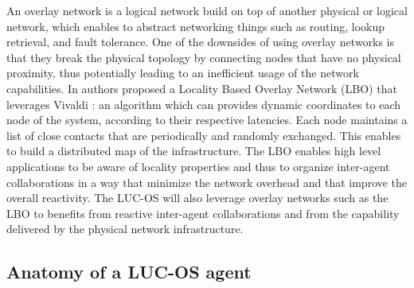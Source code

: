 An overlay network is a logical network build on top of another physical or 
logical network, which enables to abstract networking things such as routing, 
lookup retrieval, and fault tolerance. One of the downsides of using overlay 
networks is that they break the physical topology by connecting nodes that have 
no physical proximity, thus potentially leading to an inefficient usage of the
network capabilities. In \cite{pastor:hal-00991530} authors proposed a Locality 
Based Overlay Network (LBO) that leverages Vivaldi \cite{dabek:2004:vivaldi}: an
algorithm which can provides dynamic coordinates to each node of the system, 
according to their respective latencies. Each node 
maintains a list of close contacts that are periodically and randomly exchanged.
This enables to build a distributed map of the infrastructure. The LBO enables 
high level applications to be aware of locality properties and thus to organize 
inter-agent collaborations in a way that minimize the network overhead and that 
improve the overall reactivity. The LUC-OS will also leverage overlay networks
such as the LBO to benefits from reactive inter-agent collaborations and from 
the capability delivered by the physical network infrastructure.





\subsection{Anatomy of a LUC-OS agent}


